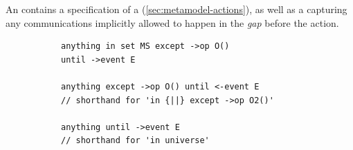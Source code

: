 An \mactionstep{} contains a specification of a
\msequenceaction{} (\cref{sec:metamodel-actions}), as well as
a \mmessageset{}
capturing any communications implicitly allowed to happen
in the \emph{gap} before the action.

\begin{figure}[H]
  \begin{subfigure}[c]{\egtextwidth}
    \begin{lstlisting}[style=Example]
anything in set MS except ->op O()
until ->event E

anything except ->op O() until <-event E
// shorthand for 'in {||} except ->op O2()'

anything until ->event E
// shorthand for 'in universe'
    \end{lstlisting}
  \end{subfigure}
  \hfill
  \begin{subfigure}[c]{\eggraphicalwidth}
    \gsecaption
    \centering
  \end{subfigure}
\end{figure}
